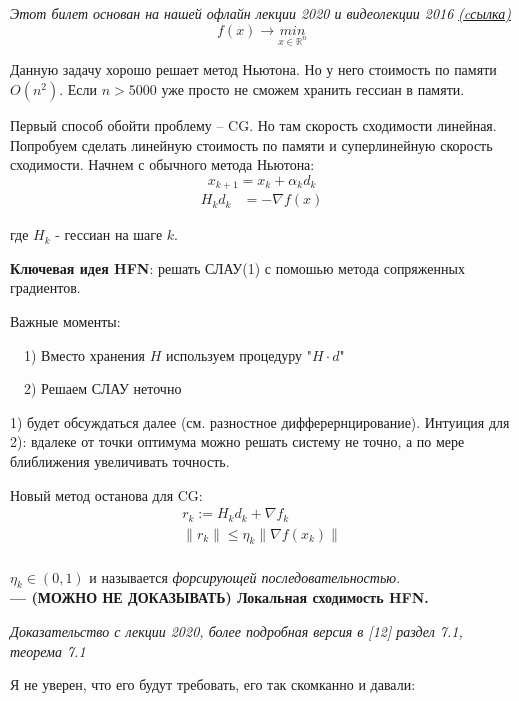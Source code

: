 \textit{Этот билет основан на нашей офлайн лекции 2020 и видеолекции 2016}
\hyperref{https://yadi.sk/i/VhIMQ5NKq3r2v}{}{}{\textit{(cсылка)}}
\\
$$f(x) \rightarrow \underset{x\in \mathbb{R}^n}{min}$$

Данную задачу хорошо решает метод Ньютона. Но у него стоимость по памяти $O(n^2)$. Если $n > 5000$ уже просто не сможем хранить гессиан в памяти.

Первый способ обойти проблему -- CG. Но там скорость сходимости линейная. Попробуем сделать линейную стоимость по памяти и суперлинейную скорость сходимости. Начнем с обычного метода Ньютона:
$$
x_{k+1} = x_k + \alpha_k d_k
$$
\begin{align}
    H_k d_k &= -\nabla f(x) \tag{1}
\end{align}

где $H_k$ - гессиан на шаге $k$.

\noindent \textbf{Ключевая идея HFN}: решать СЛАУ(1) с помошью метода сопряженных градиентов.

Важные моменты:

\ \ 1) Вместо хранения $H$ используем процедуру "$H\cdot d$"

\ \ 2) Решаем СЛАУ неточно

1) будет обсуждаться далее (см. разностное дифферернцирование). Интуиция для 2): вдалеке от точки оптимума можно решать систему не точно, а по мере блиближения увеличивать точность.

\noindent Новый метод останова для CG:
\begin{gather*}
    r_k := H_k d_k + \nabla f_k\\
    \| r_k\| \le \eta_k\|\nabla f(x_k)\|\\
\end{gather*}

$\eta_k \in (0, 1)$ и называется \textit{форсирующей последовательностью}.
\\

\noindent \textbf{--- (МОЖНО НЕ ДОКАЗЫВАТЬ) Локальная сходимость HFN.}

\textit{Доказательство с лекции 2020, более подробная версия в [12] раздел 7.1, теорема 7.1}

Я не уверен, что его будут требовать, его так скомканно и давали:

